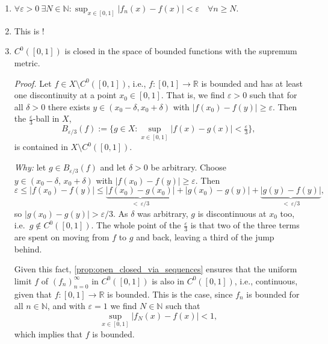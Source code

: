 \begin{exercisesolution}
\begin{enumerate}[label=\textbf{(\alph*)}]
  \item $\displaystyle \forall \varepsilon > 0 \ \exists N \in \mathbb{N} : \sup_{x \in [0,1]} |f_n(x) - f(x)| < \varepsilon \quad \forall n \geq N$.
  \item This is  !
  \item $C^0([0,1])$ is closed in the space of bounded functions with the supremum metric.

    \textit{Proof.} Let $f \in X \setminus C^0([0,1])$, i.e., $f : [0,1] \to \mathbb{R}$ is
    bounded and has at least one discontinuity at a point $x_0 \in [0,1]$. That is, we find
    $\varepsilon > 0$ such that for all $\delta > 0$ there exists $y \in (x_0 - \delta, x_0 +
    \delta)$ with $|f(x_0) - f(y)| \geq \varepsilon$. Then the $\tfrac{\varepsilon}{3}$-ball in
    $X$,
    \[
    B_{\varepsilon/3}(f) := \Big\{ g \in X : \sup_{x \in [0,1]} |f(x) - g(x)| < \tfrac{\varepsilon}{3} \Big\},
    \]
    is contained in $X \setminus C^0([0,1])$.

    \textit{Why:} let $g \in B_{\varepsilon/3}(f)$ and let $\delta > 0$ be arbitrary. Choose
    $y \in (x_0-\delta,\,x_0+\delta)$ with $|f(x_0)-f(y)| \geq \varepsilon$. Then
    \[\varepsilon \leq |f(x_0)-f(y)|
      \leq \underbrace{|f(x_0)-g(x_0)|}_{<\ \varepsilon/3}
         + |g(x_0)-g(y)|
         + \underbrace{|g(y)-f(y)|}_{<\ \varepsilon/3},\]
    so $|g(x_0)-g(y)| > \varepsilon/3$. As $\delta$ was arbitrary, $g$ is discontinuous at
    $x_0$ too, i.e.\ $g \notin C^0([0,1])$. The whole point of the $\tfrac{\varepsilon}{3}$ is
    that two of the three terms are spent on moving from $f$ to $g$ and back, leaving a third
    of the jump behind.

    Given this fact, \cref{prop:open_closed_via_sequences} ensures that the uniform limit $f$ of
    $(f_n)_{n=0}^{\infty}$ in $C^0([0,1])$ is also in $C^0([0,1])$, i.e., continuous, given that
    $f : [0,1] \to \mathbb{R}$ is bounded. This is the case, since $f_n$ is bounded for all
    $n \in \mathbb{N}$, and with $\varepsilon = 1$ we find $N \in \mathbb{N}$ such that
    \[
    \sup_{x \in [0,1]} |f_N(x) - f(x)| < 1,
    \]
    which implies that $f$ is bounded.
\end{enumerate}
\end{exercisesolution}

